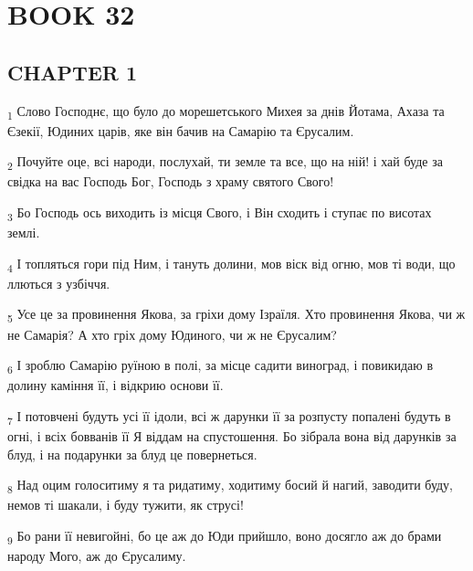 \section{BOOK 32}
\subsection{CHAPTER 1}
\begin{tcolorbox}
\textsubscript{1} Слово Господнє, що було до морешетського Михея за днів Йотама, Ахаза та Єзекії, Юдиних царів, яке він бачив на Самарію та Єрусалим.
\end{tcolorbox}
\begin{tcolorbox}
\textsubscript{2} Почуйте оце, всі народи, послухай, ти земле та все, що на ній! і хай буде за свідка на вас Господь Бог, Господь з храму святого Свого!
\end{tcolorbox}
\begin{tcolorbox}
\textsubscript{3} Бо Господь ось виходить із місця Свого, і Він сходить і ступає по висотах землі.
\end{tcolorbox}
\begin{tcolorbox}
\textsubscript{4} І топляться гори під Ним, і тануть долини, мов віск від огню, мов ті води, що ллються з узбіччя.
\end{tcolorbox}
\begin{tcolorbox}
\textsubscript{5} Усе це за провинення Якова, за гріхи дому Ізраїля. Хто провинення Якова, чи ж не Самарія? А хто гріх дому Юдиного, чи ж не Єрусалим?
\end{tcolorbox}
\begin{tcolorbox}
\textsubscript{6} І зроблю Самарію руїною в полі, за місце садити виноград, і повикидаю в долину каміння її, і відкрию основи її.
\end{tcolorbox}
\begin{tcolorbox}
\textsubscript{7} І потовчені будуть усі її ідоли, всі ж дарунки її за розпусту попалені будуть в огні, і всіх бовванів її Я віддам на спустошення. Бо зібрала вона від дарунків за блуд, і на подарунки за блуд це повернеться.
\end{tcolorbox}
\begin{tcolorbox}
\textsubscript{8} Над оцим голоситиму я та ридатиму, ходитиму босий й нагий, заводити буду, немов ті шакали, і буду тужити, як струсі!
\end{tcolorbox}
\begin{tcolorbox}
\textsubscript{9} Бо рани її невигойні, бо це аж до Юди прийшло, воно досягло аж до брами народу Мого, аж до Єрусалиму.
\end{tcolorbox}
